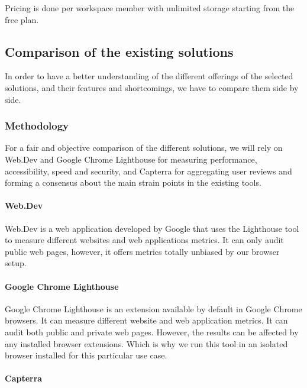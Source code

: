 Pricing is done per workspace member with unlimited storage starting
from the free plan.

\subsection{Comparison of the existing solutions}

In order to have a better understanding of the different offerings of the selected solutions, and their features and shortcomings, we have to compare them side by side.

\subsubsection{Methodology}

For a fair and objective comparison of the different solutions, we will rely on Web.Dev and Google Chrome Lighthouse for measuring performance, accessibility, speed and security, and Capterra for aggregating user reviews and forming a consensus about the main strain points in the existing tools.

\paragraph{Web.Dev}

Web.Dev is a web application developed by Google that uses the Lighthouse tool to measure different websites and web applications metrics.
It can only audit public web pages, however, it offers metrics totally unbiased by our browser setup.

\paragraph{Google Chrome Lighthouse}


Google Chrome Lighthouse is an extension available by default in Google Chrome browsers.
It can measure different website and web application metrics.
It can audit both public and private web pages. However, the results can be affected by any installed browser extensions.
Which is why we run this tool in an isolated browser installed for this particular use case.

\paragraph{Capterra}

